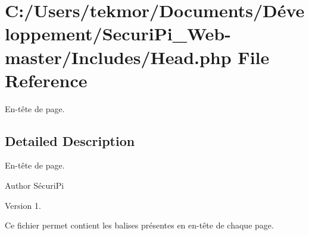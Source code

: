 \section{C\+:/\+Users/tekmor/\+Documents/\+Développement/\+Securi\+Pi\+\_\+\+Web-\/master/\+Includes/\+Head.php File Reference}
\label{_head_8php}


En-\/t\^{e}te de page.  




\subsection{Detailed Description}
En-\/t\^{e}te de page. 

\begin{DoxyAuthor}{Author}
Sécuri\+Pi 
\end{DoxyAuthor}
\begin{DoxyVersion}{Version}
1.
\end{DoxyVersion}
Ce fichier permet contient les balises présentes en en-\/t\^{e}te de chaque page. 